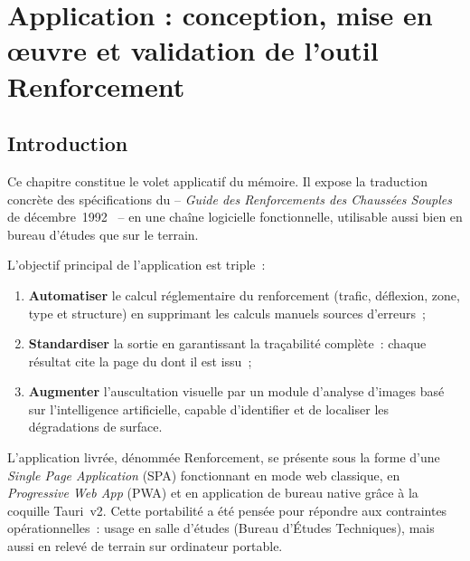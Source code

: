\chapter{Application : conception, mise en œuvre et validation de
l'outil \cttp{} Renforcement}
\label{chap:application}

\section{Introduction}
\label{sec:intro-chap}

Ce chapitre constitue le volet applicatif du mémoire. Il expose la traduction
concrète des spécifications du \cttp{} -- \textit{Guide des Renforcements des
Chaussées Souples} de décembre~1992~\cite{cttp1992} -- en une chaîne
logicielle fonctionnelle, utilisable aussi bien en bureau d'études que sur le
terrain.

L'objectif principal de l'application est triple~:

\begin{enumerate}
  \item \textbf{Automatiser} le calcul réglementaire du renforcement
        (trafic, déflexion, zone, type et structure) en supprimant les
        calculs manuels sources d'erreurs~;
  \item \textbf{Standardiser} la sortie en garantissant la traçabilité
        complète~: chaque résultat cite la page du \cttp{} dont il est issu~;
  \item \textbf{Augmenter} l'auscultation visuelle par un module d'analyse
        d'images basé sur l'intelligence artificielle, capable d'identifier
        et de localiser les dégradations de surface.
\end{enumerate}

L'application livrée, dénommée \cttp{} Renforcement, se présente sous la
forme d'une \emph{Single Page Application} (SPA) fonctionnant en mode web
classique, en \emph{Progressive Web App} (PWA) et en application de bureau
native grâce à la coquille Tauri~v2. Cette portabilité a été pensée pour
répondre aux contraintes opérationnelles~: usage en salle d'études
(Bureau d'Études Techniques), mais aussi en relevé de terrain sur
ordinateur portable.


